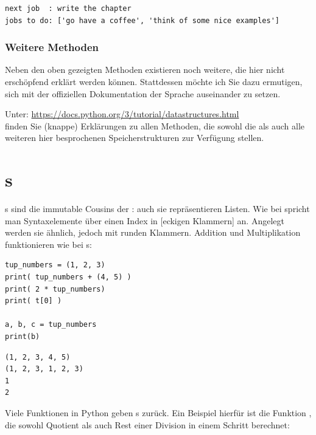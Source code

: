 \begin{cmdbox}[Ausgabe]
\begin{verbatim}
next job  : write the chapter
jobs to do: ['go have a coffee', 'think of some nice examples']
\end{verbatim}
\end{cmdbox}

\subsubsection{Weitere Methoden}
Neben den oben gezeigten Methoden existieren noch weitere, die hier nicht erschöpfend erklärt werden können. Stattdessen möchte ich Sie dazu ermutigen, sich mit der offiziellen Dokumentation der Sprache auseinander zu setzen. 

Unter:\newline
\url{https://docs.python.org/3/tutorial/datastructures.html}\\
finden Sie (knappe) Erklärungen zu allen Methoden, die sowohl die  als auch alle weiteren hier besprochenen Speicherstrukturen zur Verfügung stellen.

\section{s}
s sind die immutable Cousins der : auch sie repräsentieren Listen. Wie bei  spricht man Syntaxelemente über einen Index in [eckigen Klammern] an. Angelegt werden sie ähnlich, jedoch mit runden Klammern. Addition und Multiplikation funktionieren wie bei s:

\begin{codebox}
\begin{verbatim}
tup_numbers = (1, 2, 3)
print( tup_numbers + (4, 5) )
print( 2 * tup_numbers)
print( t[0] )

a, b, c = tup_numbers
print(b)
\end{verbatim}
\end{codebox}

\begin{cmdbox}[Ausgabe]
\begin{verbatim}
(1, 2, 3, 4, 5)
(1, 2, 3, 1, 2, 3)
1
2
\end{verbatim}
\end{cmdbox}

Viele Funktionen in Python geben s zurück. Ein Beispiel hierfür ist die Funktion , die sowohl Quotient als auch Rest einer Division in einem Schritt berechnet:

